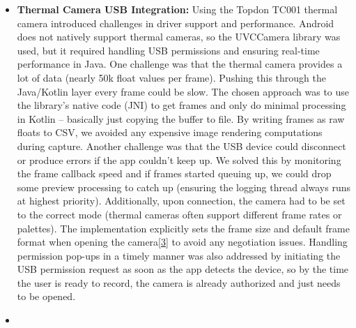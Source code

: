 \documentclass[12pt,a4paper]{article}
\begin{document}
\begin{itemize}
\item
  \textbf{Thermal Camera USB Integration:} Using the Topdon TC001 thermal camera introduced challenges in driver support and performance. Android does not natively support thermal cameras, so the UVCCamera library was used, but it required handling USB permissions and ensuring real-time performance in Java. One challenge was that the thermal camera provides a lot of data (nearly 50k float values per frame). Pushing this through the Java/Kotlin layer every frame could be slow. The chosen approach was to use the library's native code (JNI) to get frames and only do minimal processing in Kotlin -- basically just copying the buffer to file. By writing frames as raw floats to CSV, we avoided any expensive image rendering computations during capture. Another challenge was that the USB device could disconnect or produce errors if the app couldn't keep up. We solved this by monitoring the frame callback speed and if frames started queuing up, we could drop some preview processing to catch up (ensuring the logging thread always runs at highest priority). Additionally, upon connection, the camera had to be set to the correct mode (thermal cameras often support different frame rates or palettes). The implementation explicitly sets the frame size and default frame format when opening the camera\href{https://github.com/buccancs/GSR-Dual-Video-System/blob/05ae360cb7b4ae7c7861f72deb235ad64a74b38e/android/app/src/main/java/com/yourcompany/gsrcapture/hardware/TopdonThermalCamera.kt\#L84-L92}{{[}3{]}} to avoid any negotiation issues. Handling permission pop-ups in a timely manner was also addressed by initiating the USB permission request as soon as the app detects the device, so by the time the user is ready to record, the camera is already authorized and just needs to be opened.
\item

\end{itemize}
\end{document}
